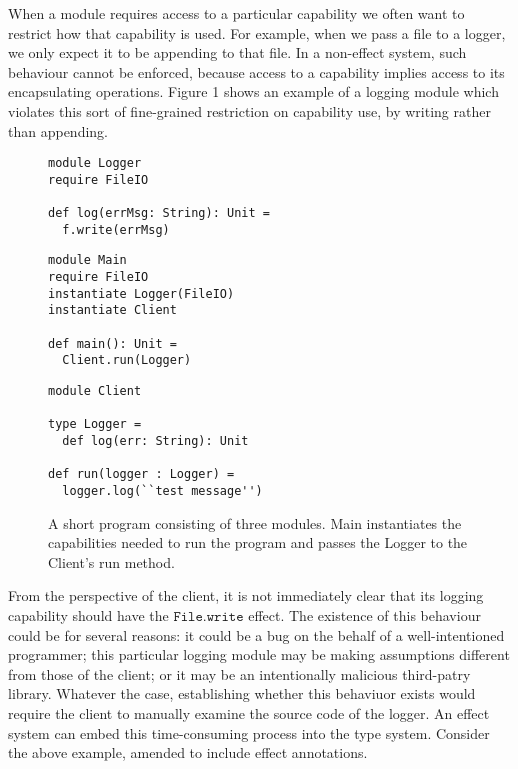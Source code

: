 \documentclass[a4paper,UKenglish]{lipics-v2016}
\newcommand{\kwa}[1]{\mathtt{ #1 }}
\begin{document}
When a module requires access to a particular capability we often want to restrict how that capability is used. For example, when we pass a file to a logger, we only expect it to be appending to that file. In a non-effect system, such behaviour cannot be enforced, because access to a capability implies access to its encapsulating operations. Figure 1 shows an example of a logging module which violates this sort of fine-grained restriction on capability use, by writing rather than appending.

\begin{figure}[h]
\vspace{-5pt}
\begin{lstlisting}[mathescape]
module Logger
require FileIO

def log(errMsg: String): Unit =
  f.write(errMsg)
\end{lstlisting}

\begin{lstlisting}
module Main
require FileIO
instantiate Logger(FileIO)
instantiate Client

def main(): Unit =
  Client.run(Logger)
\end{lstlisting}


\begin{lstlisting}
module Client

type Logger =
  def log(err: String): Unit

def run(logger : Logger) =
  logger.log(``test message'')
\end{lstlisting}

\vspace{-7pt}
\caption{A short program consisting of three modules. Main instantiates the capabilities needed to run the program and passes the Logger to the Client's run method. }
\label{f-resource-modules}
\end{figure}

From the perspective of the client, it is not immediately clear that its logging capability should have the $\kwa{File.write}$ effect. The existence of this behaviour could be for several reasons: it could be a bug on the behalf of a well-intentioned programmer; this particular logging module may be making assumptions different from those of the client; or it may be an intentionally malicious third-patry library. Whatever the case, establishing whether this behaviuor exists would require the client to manually examine the source code of the logger. An effect system can embed this time-consuming process into the type system. Consider the above example, amended to include effect annotations.
\end{document}
